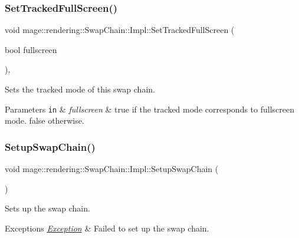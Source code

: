 \subsubsection{\texorpdfstring{Set\+Tracked\+Full\+Screen()}{SetTrackedFullScreen()}}
{\footnotesize\ttfamily void mage\+::rendering\+::\+Swap\+Chain\+::\+Impl\+::\+Set\+Tracked\+Full\+Screen (\begin{DoxyParamCaption}\item[{bool}]{fullscreen }\end{DoxyParamCaption})\hspace{0.3cm}{\ttfamily [private]}, {\ttfamily [noexcept]}}

Sets the tracked mode of this swap chain.


\begin{DoxyParams}[1]{Parameters}
\mbox{\tt in}  & {\em fullscreen} & {\ttfamily true} if the tracked mode corresponds to fullscreen mode. {\ttfamily false} otherwise. \\
\hline
\end{DoxyParams}
\hypertarget{classmage_1_1rendering_1_1_swap_chain_1_1_impl_a1e34fe9c72a24a0345a9ba317762863d}{}\label{classmage_1_1rendering_1_1_swap_chain_1_1_impl_a1e34fe9c72a24a0345a9ba317762863d} 
\subsubsection{\texorpdfstring{Setup\+Swap\+Chain()}{SetupSwapChain()}}
{\footnotesize\ttfamily void mage\+::rendering\+::\+Swap\+Chain\+::\+Impl\+::\+Setup\+Swap\+Chain (\begin{DoxyParamCaption}{ }\end{DoxyParamCaption})\hspace{0.3cm}{\ttfamily [private]}}

Sets up the swap chain.


\begin{DoxyExceptions}{Exceptions}
{\em \hyperlink{classmage_1_1_exception}{Exception}} & Failed to set up the swap chain. \\
\hline
\end{DoxyExceptions}
\hypertarget{classmage_1_1rendering_1_1_swap_chain_1_1_impl_aa3c391f6651074e73105174b68025731}{}\label{classmage_1_1rendering_1_1_swap_chain_1_1_impl_aa3c391f6651074e73105174b68025731} 
